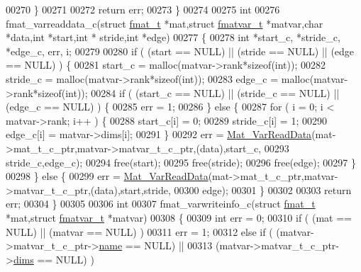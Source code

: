 \begin{DoxyCode}
{{00270     \}
00271 
00272     \textcolor{keywordflow}{return} err;
00273 \}
00274 
00275 \textcolor{keywordtype}{int}
00276 fmat\_varreaddata\_c(\textcolor{keyword}{struct} \hyperlink{structfmat__t}{fmat\_t} *mat,\textcolor{keyword}{struct} \hyperlink{structfmatvar__t}{fmatvar\_t} *matvar,\textcolor{keywordtype}{char} *data,\textcolor{keywordtype}{int} *start,\textcolor{keywordtype}{int} *
      stride,\textcolor{keywordtype}{int} *edge)
00277 \{
00278     \textcolor{keywordtype}{int} *start\_c, *stride\_c, *edge\_c, err, i;
00279 
00280     \textcolor{keywordflow}{if} ( (start == NULL) || (stride == NULL) || (edge == NULL) ) \{
00281         start\_c  = malloc(matvar->rank*\textcolor{keyword}{sizeof}(\textcolor{keywordtype}{int}));
00282         stride\_c = malloc(matvar->rank*\textcolor{keyword}{sizeof}(\textcolor{keywordtype}{int}));
00283         edge\_c   = malloc(matvar->rank*\textcolor{keyword}{sizeof}(\textcolor{keywordtype}{int}));
00284         \textcolor{keywordflow}{if} ( (start\_c == NULL) || (stride\_c == NULL) || (edge\_c == NULL) ) \{
00285             err = 1;
00286         \} \textcolor{keywordflow}{else} \{
00287             \textcolor{keywordflow}{for} ( i = 0; i < matvar->rank; i++ ) \{
00288                 start\_c[i]  = 0;
00289                 stride\_c[i] = 1;
00290                 edge\_c[i]   = matvar->dims[i];
00291             \}
00292             err = \hyperlink{group___m_a_t_ga1845000f4fc6252ec5ff11c4b9f0759f}{Mat\_VarReadData}(mat->mat\_t\_c\_ptr,matvar->matvar\_t\_c\_ptr,(data),start\_c,
00293                                   stride\_c,edge\_c);
00294             free(start);
00295             free(stride);
00296             free(edge);
00297         \}
00298     \} \textcolor{keywordflow}{else} \{
00299         err = \hyperlink{group___m_a_t_ga1845000f4fc6252ec5ff11c4b9f0759f}{Mat\_VarReadData}(mat->mat\_t\_c\_ptr,matvar->matvar\_t\_c\_ptr,(data),start,stride,
00300                               edge);
00301     \}
00302 
00303     \textcolor{keywordflow}{return} err;
00304 \}
00305 
00306 \textcolor{keywordtype}{int}
00307 fmat\_varwriteinfo\_c(\textcolor{keyword}{struct} \hyperlink{structfmat__t}{fmat\_t} *mat,\textcolor{keyword}{struct} \hyperlink{structfmatvar__t}{fmatvar\_t} *matvar)
00308 \{
00309     \textcolor{keywordtype}{int} err = 0;
00310     \textcolor{keywordflow}{if} ( (mat == NULL) || (matvar == NULL) )
00311         err =  1;
00312     \textcolor{keywordflow}{else} \textcolor{keywordflow}{if} ( (matvar->matvar\_t\_c\_ptr->\hyperlink{group___m_a_t_a5d4b55b041e3b4fb50c04337f05ad909}{name} == NULL) ||
00313               (matvar->matvar\_t\_c\_ptr->\hyperlink{group___m_a_t_a8e01234e1c862ce3472bb37f5a09b92c}{dims} == NULL) )
}}
\end{DoxyCode}
